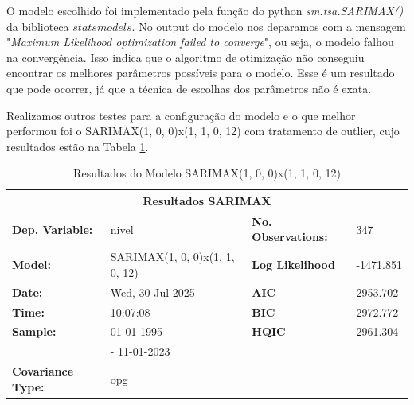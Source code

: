 \documentclass[ 12pt,a4paper ]{article} %
\begin{document}
	 O modelo escolhido foi implementado pela função do python \textit{sm.tsa.SARIMAX()} da biblioteca $statsmodels$. No output do modelo nos deparamos com a mensagem "\textit{Maximum Likelihood optimization failed to converge}", ou seja, o modelo falhou na convergência. Isso indica que o algoritmo de otimização não conseguiu encontrar os melhores parâmetros possíveis para o modelo. Esse é um resultado que pode ocorrer, já que a técnica de escolhas dos parâmetros não é exata.
	 
	 Realizamos outros testes para a configuração do modelo e o que melhor performou foi o SARIMAX(1, 0, 0)x(1, 1, 0, 12) com tratamento de outlier, cujo resultados estão na Tabela \ref{tab2:sarimax_results}. 
	 
	 \begin{table}[htbp] %
	 	\centering
	 	\caption{Resultados do Modelo SARIMAX(1, 0, 0)x(1, 1, 0, 12)}
	 	\label{tab2:sarimax_results}
	 	\small %
	 	
	 	\begin{tabular}{llll}
	 		\toprule
	 		\multicolumn{4}{c}{\textbf{Resultados SARIMAX}} \\
	 		\midrule
	 		\textbf{Dep. Variable:}      & nivel                          & \textbf{No. Observations:} & 347                \\
	 		\textbf{Model:}              & SARIMAX(1, 0, 0)x(1, 1, 0, 12) & \textbf{Log Likelihood}    & -1471.851          \\
	 		\textbf{Date:}               & Wed, 30 Jul 2025               & \textbf{AIC}               & 2953.702           \\
	 		\textbf{Time:}               & 10:07:08                       & \textbf{BIC}               & 2972.772           \\
	 		\textbf{Sample:}             & 01-01-1995                     & \textbf{HQIC}              & 2961.304           \\
	 		& - 11-01-2023                   &                            &                    \\
	 		\textbf{Covariance Type:}    & opg                            &                            &                    \\
	 		\bottomrule
	 	\end{tabular}
	 	
	 	\medskip %
	 	

\end{table}
\end{document}
